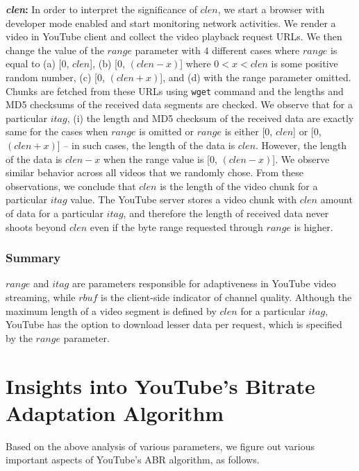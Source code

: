 {\bf {\em clen}:} In order to interpret the significance of $clen$, we start a browser with developer mode enabled and start monitoring network activities.
We render a video in YouTube client and collect the video playback request URLs.
We then change the value of the $range$ parameter with $4$ different cases where $range$ is equal to (a) [$0$, $clen$],  (b) [$0$, $(clen-x)$] where $0<x<clen$ is some positive random number, (c) [$0$, $(clen+x)$], and (d) with the range parameter omitted.
Chunks are fetched from these URLs using \texttt{wget} command and the lengths and MD5 checksums of the received data segments are checked.
We observe that for a particular $itag$, (i) the length and MD5 checksum of the received data are exactly same for the cases when  $range$ is omitted or $range$ is either [$0$, $clen$] or [$0$, $(clen+x)$] -- in such cases, the length of the data is $clen$.
However, the length of the data is $clen-x$ when the range value is [$0$, $(clen-x)$].
We observe similar behavior across all videos that we randomly chose.
From these observations, we conclude that $clen$ is the length of the video chunk for a particular $itag$ value.
The YouTube server stores a video chunk with $clen$ amount of data for a particular $itag$, and therefore the length of received data never shoots beyond $clen$ even if the byte range requested through $range$ is higher.

\subsubsection{Summary} $range$ and $itag$ are parameters responsible for adaptiveness in YouTube video streaming, while $rbuf$ is the client-side indicator of channel quality. 
Although the maximum length of a video segment is defined by $clen$ for a particular $itag$, YouTube has the option to download lesser data per request, which is specified by the $range$ parameter.

\section{Insights into YouTube's Bitrate Adaptation Algorithm}
\label{chap03s1:subsec:seglength}
Based on the above analysis of various parameters, we figure out various important aspects of YouTube's ABR algorithm, as follows. 

